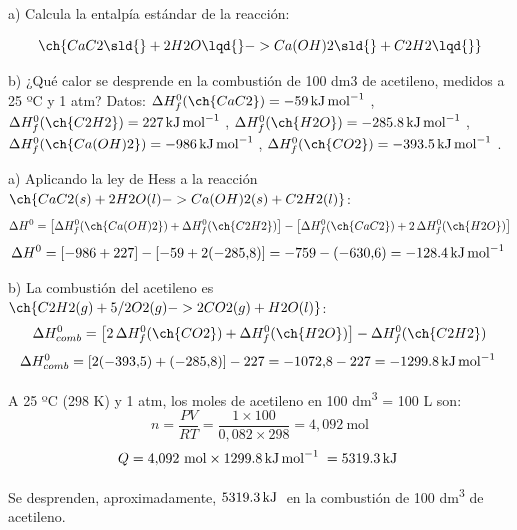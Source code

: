 \begin{exercise}
    a) Calcula la entalpía estándar de la reacción:

    \begin{equation*}
        \ch{CaC2 \sld{} + 2 H2O \lqd{} -> Ca (OH)2 \sld{} + C2H2 \lqd{}}
    \end{equation*}

    b) ¿Qué calor se desprende en la combustión de 100 dm3 de acetileno, medidos a 25 ºC y
    1 atm?
    Datos: \(\Delta H^0_f (\ch{CaC2}) = \energia[kjmol]{-59}\), \(\Delta H^0_f (\ch{C2H2}) = \energia[kjmol]{227}\), \(\Delta H^0_f (\ch{H2O}) = \energia[kjmol]{-285.8}\), \(\Delta H^0_f (\ch{Ca(OH)2}) = \energia[kjmol]{-986}\), \(\Delta H^0_f (\ch{CO2}) = \energia[kjmol]{-393.5}\).


    \begin{solu}


        a) Aplicando la ley de Hess a la reacción \(\ch{CaC2 (s) + 2 H2O (l) -> Ca(OH)2 (s) + C2H2 (l)}\):
        \[
            \Delta H^0 = \left[\Delta H^0_f(\ch{Ca(OH)2}) + \Delta H^0_f(\ch{C2H2})\right] - \left[\Delta H^0_f(\ch{CaC2}) + 2\,\Delta H^0_f(\ch{H2O})\right]
        \]
        \[
            \Delta H^0 = \left[-986+227\right] - \left[-59+2(-285{,}8)\right] = -759 - (-630{,}6) = \energia[kjmol]{-128,4}
        \]

        b) La combustión del acetileno es \(\ch{C2H2 (g) + 5/2 O2 (g) -> 2 CO2 (g) + H2O (l)}\):
        \[
            \Delta H^0_{comb} = \left[2\,\Delta H^0_f(\ch{CO2}) + \Delta H^0_f(\ch{H2O})\right] - \Delta H^0_f(\ch{C2H2})
        \]
        \[
            \Delta H^0_{comb} = \left[2(-393{,}5)+(-285{,}8)\right] - 227 = -1072{,}8-227 = \energia[kjmol]{-1299,8}
        \]

        A 25 ºC (298 K) y 1 atm, los moles de acetileno en 100 \si{\deci\metre\cubed} = 100 L son:
        \[
            n = \frac{PV}{RT} = \frac{1 \times 100}{0{,}082 \times 298} = 4{,}092\ \text{mol}
        \]
        \[
            Q = 4{,}092\ \text{mol} \times \energia[kjmol]{1299,8} = \energia[kj]{5319,3}
        \]

        Se desprenden, aproximadamente, \(\energia[kj]{5319,3}\) en la combustión de 100 \si{\deci\metre\cubed} de acetileno.
    \end{solu}
\end{exercise}


